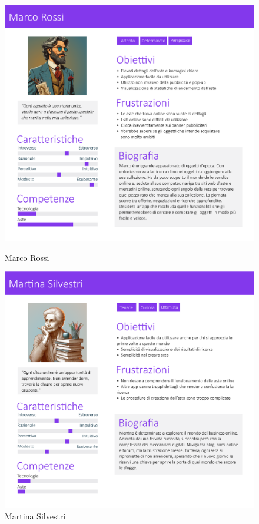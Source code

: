         \begin{figure}[!htb]
           \begin{minipage}{0.48\textwidth}
                \centering
             \includegraphics[width=.7\linewidth]{Immagini/Personas/Marco Rossi.pdf}
             \caption{Marco Rossi}\label{Fig:Marco Rossi}
           \end{minipage}\hfill
           \begin{minipage}{0.48\textwidth}
                \centering
             \includegraphics[width=.7\linewidth]{Immagini/Personas/Martina Silvestri.pdf}
             \caption{Martina Silvestri}\label{Fig:Martina Silvestri}
           \end{minipage}
        \end{figure}

        \clearpage
        
